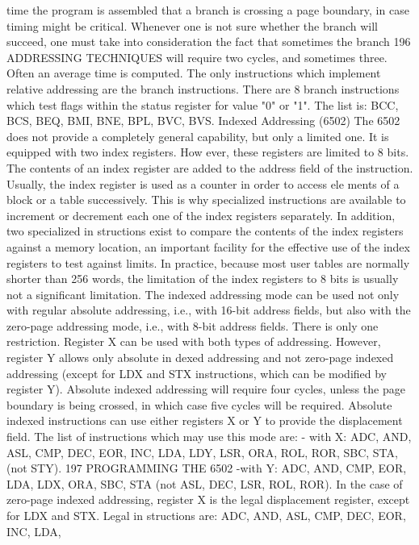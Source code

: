time the program is assembled that a branch is crossing a page
boundary, in case timing might be critical.
Whenever one is not sure whether the branch will succeed, one
must take into consideration the fact that sometimes the branch
196
ADDRESSING TECHNIQUES
will require two cycles, and sometimes three. Often an average
time is computed.
The only instructions which implement relative addressing are the
branch instructions. There are 8 branch instructions which test flags
within the status register for value "0" or "1". The list is: BCC,
BCS, BEQ, BMI, BNE, BPL, BVC, BVS.
Indexed Addressing (6502)
The 6502 does not provide a completely general capability, but
only a limited one. It is equipped with two index registers. How
ever, these registers are limited to 8 bits. The contents of an index
register are added to the address field of the instruction. Usually,
the index register is used as a counter in order to access ele
ments of a block or a table successively. This is why specialized
instructions are available to increment or decrement each one of
the index registers separately. In addition, two specialized in
structions exist to compare the contents of the index registers
against a memory location, an important facility for the effective
use of the index registers to test against limits.
In practice, because most user tables are normally shorter than
256 words, the limitation of the index registers to 8 bits is usually
not a significant limitation.
The indexed addressing mode can be used not only with regular
absolute addressing, i.e., with 16-bit address fields, but also with
the zero-page addressing mode, i.e., with 8-bit address fields.
There is only one restriction. Register X can be used with both
types of addressing. However, register Y allows only absolute in
dexed addressing and not zero-page indexed addressing (except for
LDX and STX instructions, which can be modified by register Y).
Absolute indexed addressing will require four cycles, unless the
page boundary is being crossed, in which case five cycles will be
required.
Absolute indexed instructions can use either registers X or Y to
provide the displacement field. The list of instructions which may
use this mode are:
- with X: ADC, AND, ASL, CMP, DEC, EOR, INC, LDA, LDY,
LSR, ORA, ROL, ROR, SBC, STA, (not STY).
197
PROGRAMMING THE 6502
-with Y: ADC, AND, CMP, EOR, LDA, LDX, ORA, SBC, STA
(not ASL, DEC, LSR, ROL, ROR).
In the case of zero-page indexed addressing, register X is the
legal displacement register, except for LDX and STX. Legal in
structions are: ADC, AND, ASL, CMP, DEC, EOR, INC, LDA,
